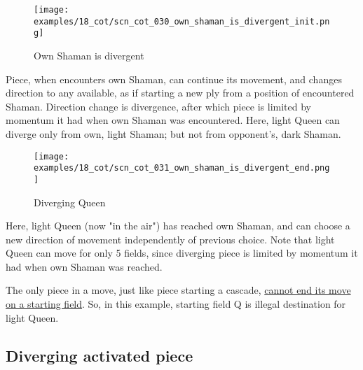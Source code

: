 \vspace*{-1.4\baselineskip}
\noindent
\begin{figure}[!h]
\texttt{[image: examples/18\_cot/scn\_cot\_030\_own\_shaman\_is\_divergent\_init.png]}
\vspace*{-1.3\baselineskip}
\caption{Own Shaman is divergent}
\label{fig:scn_cot_030_own_shaman_is_divergent_init}
\end{figure}

\vspace*{-0.5\baselineskip}
Piece, when encounters own Shaman, can continue its movement, and changes direction
to any available, as if starting a new ply from a position of encountered Shaman.
Direction change is divergence, after which piece is limited by momentum it had when
own Shaman was encountered. \newline
\indent
Here, light Queen can diverge only from own, light Shaman; but not from opponent's,
dark Shaman.

\clearpage %

\vspace*{-2.1\baselineskip}
\noindent
\begin{figure}[!h]
\texttt{[image: examples/18\_cot/scn\_cot\_031\_own\_shaman\_is\_divergent\_end.png]}
\vspace*{-1.3\baselineskip}
\caption{Diverging Queen}
\label{fig:scn_cot_031_own_shaman_is_divergent_end}
\end{figure}

\vspace*{-0.4\baselineskip}
Here, light Queen (now "in the air") has reached own Shaman, and can choose a new
direction of movement independently of previous choice. Note that light Queen can
move for only 5 fields, since diverging piece is limited by momentum it had when
own Shaman was reached.

The only piece in a move, just like piece starting a cascade,
\hyperref[fig:scn_mv_47_static_move_is_illegal_init]{cannot end its move on a starting field}.
So, in this example, starting field Q is illegal destination for light Queen.

\clearpage %

\subsection*{Diverging activated piece}
\label{sec:Conquest of Tlalocan/Divergence/Diverging activated piece}

